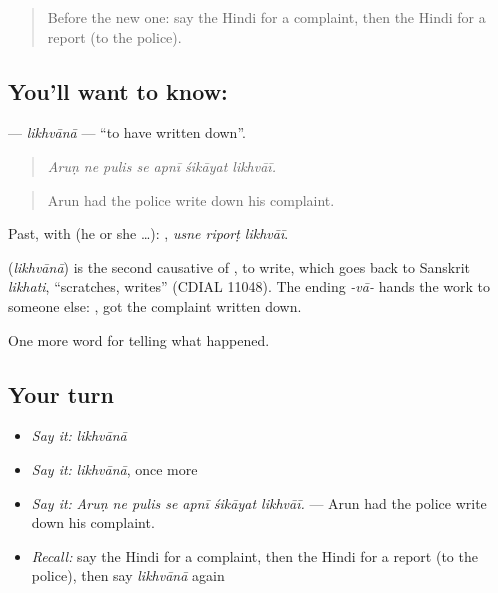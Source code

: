 \label{lesson:HI-C290-likhvana}



\begin{quote}
Before the new one: say the Hindi for a complaint, then the Hindi for a report (to the police).
\end{quote}

\subsection*{You'll want to know: }
\textbf{} — \emph{likhvānā} — \textquotedblleft{}to have written down\textquotedblright{}.

\begin{quote}
      
\end{quote}

\begin{quote}
\emph{Aruṇ ne pulis se apnī śikāyat likhvāī.}
\end{quote}

\begin{quote}
Arun had the police write down his complaint.
\end{quote}

Past, with  (he or she …):   , \emph{usne riporṭ likhvāī}.

\begin{cousinweb}
\textbf{} (\emph{likhvānā}) is the second causative of \textbf{}, to write, which goes back to Sanskrit \emph{likhati}, \textquotedblleft{}scratches, writes\textquotedblright{} (CDIAL 11048). The ending \emph{-vā-} hands the work to someone else: \textbf{ }, got the complaint written down.
\end{cousinweb}

\begin{grammarlens}[title={What you've built}]
One more word for telling what happened.
\end{grammarlens}

\subsection*{Your turn}
\begin{itemize}
\raggedright
  \item \emph{Say it:} \emph{likhvānā}
  \item \emph{Say it:} \emph{likhvānā}, once more
  \item \emph{Say it:} \emph{Aruṇ ne pulis se apnī śikāyat likhvāī.} — Arun had the police write down his complaint.
  \item \emph{Recall:} say the Hindi for a complaint, then the Hindi for a report (to the police), then say \emph{likhvānā} again
\end{itemize}

